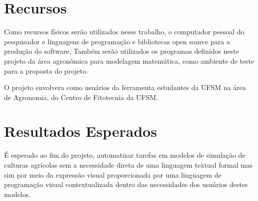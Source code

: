 \documentclass[12pt]{article}
\begin{document}
	
	\section{Recursos}
	
	Como recursos físicos serão utilizados nesse trabalho, o computador pessoal do pesquisador e linguagens de programação e bibliotecas open source para a produção do software, Também serão utilizados os programas definidos neste projeto da área agronômica para modelagem matemática, como ambiente de teste para a proposta do projeto.

	O projeto envolvera como usuários da ferramenta estudantes da UFSM na área de Agronomia, do Centro de Fitotecnia da UFSM. 

	\section{Resultados Esperados}
	
	É esperado ao fim do projeto, automatizar tarefas em modelos de simulação de culturas agrícolas sem a necessidade direta de uma linguagem textual formal mas sim por meio da expressão visual proporcionada por uma linguagem de programação visual contextualizada dentro das necessidades dos usuários destes modelos. 

	
	 
	
\end{document}
